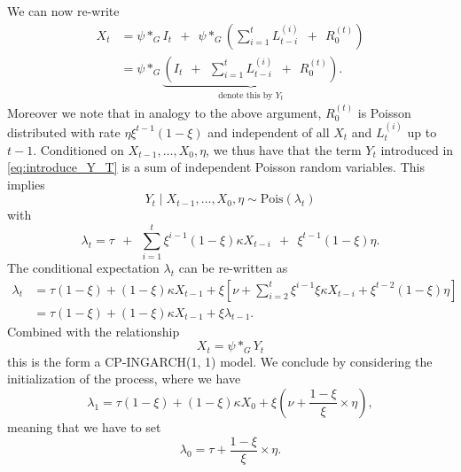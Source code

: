 \documentclass[10pt,a4paper]{article}
\begin{document}
We can now re-write
\begin{align}
X_t & = \psi *_G I_t \ \ + \ \ \psi *_G\left(\sum_{i = 1}^{t} L_{t - i}^{(i)} \ \ + \ \ R_0^{(t)}\right)\nonumber \\
& = \psi *_G \underbrace{\left( I_t \ \ + \ \ \sum_{i = 1}^{t} L_{t - i}^{(i)} \ \ + \ \ R_0^{(t)}\right)}_{\text{denote this by } Y_t}. \label{eq:introduce_Y_T}
\end{align}
Moreover we note that in analogy to the above argument, $R_0^{(t)}$ is Poisson distributed with rate $\eta\xi^{t - 1}(1 - \xi)$ and independent of all $X_t$ and $L_t^{(i)}$ up to $t - 1$. Conditioned on $X_{t - 1}, \dots, X_0, \eta$, we thus have that the term $Y_t$ introduced in \eqref{eq:introduce_Y_T} is a sum of independent Poisson random variables. This implies
$$
Y_t \mid X_{t - 1}, \dots, X_0, \eta \sim \text{Pois}(\lambda_t)
$$
with
$$
\lambda_t = \tau \ \ + \ \ \sum_{i = 1}^t \xi^{i - 1}(1 - \xi)\kappa X_{t - i} \ \ + \ \ \xi^{t - 1}(1 - \xi)\eta.
$$
The conditional expectation $\lambda_t$ can be re-written as
\begin{align*}
\lambda_t & = \tau(1 - \xi) + (1 - \xi)\kappa X_{t - 1} + \xi \left[\nu +   \sum_{i = 2}^t \xi^{i - 1}\xi\kappa X_{t - i}  + \xi^{t - 2}(1 - \xi)\eta\right]\\
& = \tau(1 - \xi) + (1 - \xi)\kappa X_{t - 1} + \xi \lambda_{t - 1}.
\end{align*}
Combined with the relationship
$$
X_t = \psi *_G Y_t
$$
this is the form a CP-INGARCH(1, 1) model. We conclude by considering the initialization of the process, where we have
$$
\lambda_1 = \tau(1 - \xi) + (1 - \xi)\kappa X_0 + \xi\left(\nu + \frac{1 - \xi}{\xi} \times \eta \right),
$$
meaning that we have to set
$$
\lambda_0 = \tau + \frac{1 - \xi}{\xi} \times \eta.
$$

%
%
%
\end{document}

